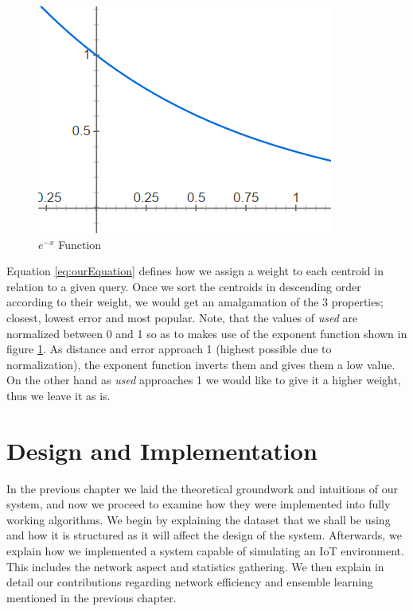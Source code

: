 \documentclass{mproj}
\begin{document}
\begin{figure}[H]
\caption{$e^{-x}$ Function}
\label{fig:e-x}
\centerline{\includegraphics[scale=0.6]{e-x}}
\end{figure}

Equation \ref{eq:ourEquation} defines how we assign a weight to each centroid in relation to a given query. Once we sort the centroids in descending order according to their weight, we would get an amalgamation of the 3 properties; closest, lowest error and most popular. Note, that the values of \textit{used} are normalized between 0 and 1 so as to makes use of the exponent function shown in figure \ref{fig:e-x}. As distance and error approach 1 (highest possible due to normalization), the exponent function inverts them and gives them a low value. On the other hand as \textit{used} approaches 1 we would like to give it a higher weight, thus we leave it as is.

\chapter{Design and Implementation}
In the previous chapter we laid the theoretical groundwork and intuitions of our system, and now we proceed to examine how they were implemented into fully working algorithms. We begin by explaining the dataset that we shall be using and how it is structured as it will affect the design of the system. Afterwards, we explain how we implemented a system capable of simulating an IoT environment. This includes the network aspect and statistics gathering. We then explain in detail our contributions regarding network efficiency and ensemble learning mentioned in the previous chapter.
\end{document}
